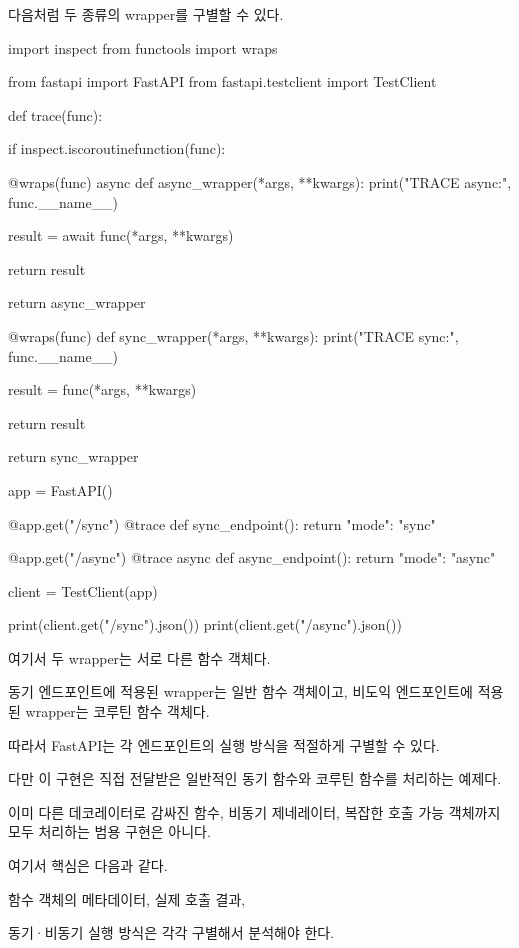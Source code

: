 다음처럼 두 종류의 wrapper를 구별할 수 있다.

\begin{dhkcode}
import inspect
from functools import wraps

from fastapi import FastAPI
from fastapi.testclient import TestClient


def trace(func):

    if inspect.iscoroutinefunction(func):

        @wraps(func)
        async def async_wrapper(*args, **kwargs):
            print("TRACE async:", func.__name__)

            result = await func(*args, **kwargs)

            return result

        return async_wrapper

    @wraps(func)
    def sync_wrapper(*args, **kwargs):
        print("TRACE sync:", func.__name__)

        result = func(*args, **kwargs)

        return result

    return sync_wrapper


app = FastAPI()


@app.get("/sync")
@trace
def sync_endpoint():
    return {"mode": "sync"}


@app.get("/async")
@trace
async def async_endpoint():
    return {"mode": "async"}


client = TestClient(app)

print(client.get("/sync").json())
print(client.get("/async").json())
\end{dhkcode}

여기서 두 wrapper는 서로 다른 함수 객체다.

동기 엔드포인트에 적용된 wrapper는 일반 함수 객체이고, 비도익 엔드포인트에 적용된 wrapper는 코루틴 함수 객체다.

따라서 FastAPI는 각 엔드포인트의 실행 방식을 적절하게 구별할 수 있다.

다만 이 구현은 직접 전달받은 일반적인 동기 함수와 코루틴 함수를 처리하는 예제다.

이미 다른 데코레이터로 감싸진 함수, 비동기 제네레이터, 복잡한 호출 가능 객체까지 모두 처리하는 범용 구현은 아니다.

여기서 핵심은 다음과 같다.

\begin{dhksmry}[centered]
함수 객체의 메타데이터, 실제 호출 결과, 

동기·비동기 실행 방식은 각각 구별해서 분석해야 한다.
\end{dhksmry}

